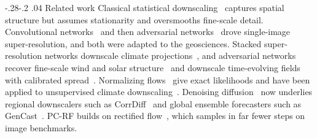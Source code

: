 \documentclass[sigconf,nonacm]{acmart}
\makeatletter
\newcommand{\pcrf}{\textsc{PC-RF}\xspace}
\renewcommand\section{\def\@toclevel{1}%
  \@startsection{section}{1}{\z@}%
  {-.28\baselineskip \@plus -1\p@ \@minus -.2\p@}%
  {.04\baselineskip}%
  {\ACM@NRadjust\@secfont}}
\makeatother
\begin{document}
\section{Related work}
\label{sec:related}
Classical statistical downscaling~\citep{maraun2018statistical} captures spatial structure but assumes stationarity and oversmooths fine-scale detail. Convolutional networks~\citep{dong2015image} and then adversarial networks~\citep{goodfellow2014generative,ledig2017photo} drove single-image super-resolution, and both were adapted to the geosciences. Stacked super-resolution networks downscale climate projections~\citep{vandal2017deepsd}, and adversarial networks recover fine-scale wind and solar structure~\citep{stengel2020adversarial} and downscale time-evolving fields with calibrated spread~\citep{leinonen2020stochastic}. Normalizing flows~\citep{rezende2015variational,dinh2016density,kingma2018glow} give exact likelihoods and have been applied to unsupervised climate downscaling~\citep{groenke2020climalign}. Denoising diffusion~\citep{ho2020denoising,song2021score} now underlies regional downscalers such as CorrDiff~\citep{mardani2023residual} and global ensemble forecasters such as GenCast~\citep{price2023gencast}. \pcrf builds on rectified flow~\citep{liu2022flow,lipman2022flow}, which samples in far fewer steps on image benchmarks.
\end{document}
